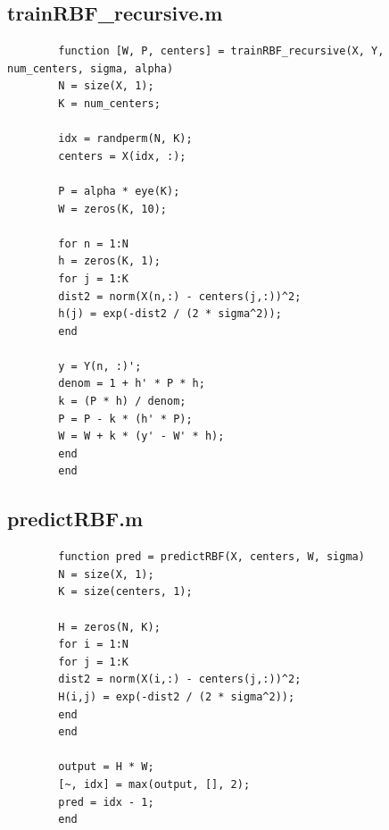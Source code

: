 \documentclass[12pt]{article}
\begin{document}
	\subsection*{trainRBF\_recursive.m}
	\begin{lstlisting}
		function [W, P, centers] = trainRBF_recursive(X, Y, num_centers, sigma, alpha)
		N = size(X, 1);
		K = num_centers;
		
		idx = randperm(N, K);
		centers = X(idx, :);
		
		P = alpha * eye(K);
		W = zeros(K, 10);
		
		for n = 1:N
		h = zeros(K, 1);
		for j = 1:K
		dist2 = norm(X(n,:) - centers(j,:))^2;
		h(j) = exp(-dist2 / (2 * sigma^2));
		end
		
		y = Y(n, :)';
		denom = 1 + h' * P * h;
		k = (P * h) / denom;
		P = P - k * (h' * P);
		W = W + k * (y' - W' * h);
		end
		end
	\end{lstlisting}
	
	\subsection*{predictRBF.m}
	\begin{lstlisting}
		function pred = predictRBF(X, centers, W, sigma)
		N = size(X, 1);
		K = size(centers, 1);
		
		H = zeros(N, K);
		for i = 1:N
		for j = 1:K
		dist2 = norm(X(i,:) - centers(j,:))^2;
		H(i,j) = exp(-dist2 / (2 * sigma^2));
		end
		end
		
		output = H * W;
		[~, idx] = max(output, [], 2);
		pred = idx - 1;
		end
	\end{lstlisting}
	
\end{document}
